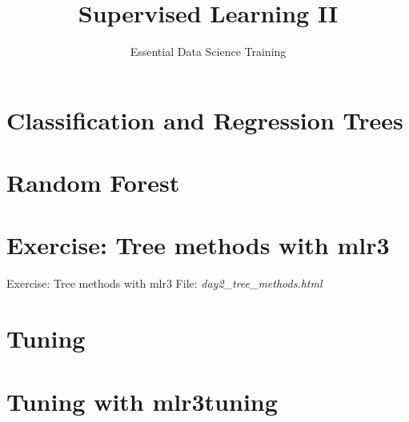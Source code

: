 \documentclass[13pt,compress]{beamer}
\title{Supervised Learning II}
\author{Essential Data Science Training}
\date{}
\begin{document}


\frame{\titlepage}

\section{Classification and Regression Trees}





\section{Random Forest}



\section{Exercise: Tree methods with mlr3}
\begin{frame}{Exercise: Tree methods with mlr3}
File: \textit{day2\_tree\_methods.html}
\end{frame}
\section{Tuning}



\section{Tuning with mlr3tuning}

\end{document}
